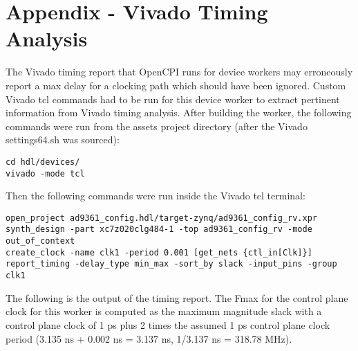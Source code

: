 \section{Appendix - Vivado Timing Analysis}
\label{appendix:timing}
The Vivado timing report that OpenCPI runs for device workers may erroneously report a max delay for a clocking path which should have been ignored. Custom Vivado tcl commands had to be run for this device worker to extract pertinent information from Vivado timing analysis. After building the worker, the following commands were run from the assets project directory (after the Vivado settings64.sh was sourced):
\begin{lstlisting}
cd hdl/devices/
vivado -mode tcl
\end{lstlisting}
Then the following commands were run inside the Vivado tcl terminal:
\begin{lstlisting}
open_project ad9361_config.hdl/target-zynq/ad9361_config_rv.xpr
synth_design -part xc7z020clg484-1 -top ad9361_config_rv -mode out_of_context
create_clock -name clk1 -period 0.001 [get_nets {ctl_in[Clk]}]
report_timing -delay_type min_max -sort_by slack -input_pins -group clk1
\end{lstlisting}
The following is the output of the timing report. The Fmax for the control plane clock for this worker is computed as the maximum magnitude slack with a control plane clock of 1 ps plus 2 times the assumed 1 ps control plane clock period (3.135 ns + 0.002 ns = 3.137 ns, 1/3.137 ns = 318.78 MHz).
\fontsize{6}{12}\selectfont
